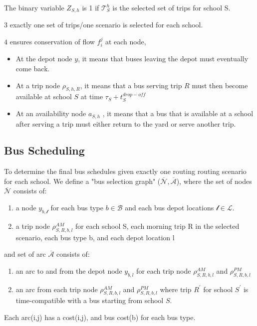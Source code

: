 \documentclass[11pt]{article}
\begin{document}
The binary variable \(Z_{S,h}\) is 1 if \(\mathcal{T}_S^h\) is the selected set
of trips for school S.


\(3\) exactly one set of trips/one scenario is
selected for each school. 

\(4\) ensures conservation of flow \(f_i^j\) at each node, 
\begin{itemize}
\item At the depot node \(y\), it means that buses leaving the depot must
eventually come back.
\item At a trip node \(\rho_{S,h,R}\), it means that a bus serving trip \(R\) must then
become available at school \(S\) at time \(\tau_S + t_S^{drop-off}\)
\item At an availability node \(a_{S,h}\) , it means that a bus that is available at
a school after serving a trip must either return to the yard or serve
another trip.
\end{itemize}

\subsection{Bus Scheduling}
\label{sec:orgf39c523}
To determine the final bus schedules given exactly one routing routing scenario for each school.
We define a "bus selection graph" (\(\overline{\mathcal{N}}, \overline{\mathcal{A}}\)), where the
set of nodes \(\overline{\mathcal{N}}\) consists of: 
\begin{enumerate}
\item a node \(y_{b,\mathcal{l}}\) for each bus type \(b \in \mathcal{B}\) and each
bus depot locations \(\mathcal{l} \in \mathcal{L}\).
\item a trip node \(\rho_{S,R,b,l}^{AM}\) for each school S, each morning trip R in the selected
scenario, each bus type b, and each depot location l
\end{enumerate}

and set of arc  \(\overline{\mathcal{A}}\) consists of:
\begin{enumerate}
\item an arc to and from the depot node \(y_{b,l}\) for each trip node
\(\rho_{S,R,b,l}^{AM}\) and \(\rho_{S,R,b,l}^{PM}\)
\item an arc from each trip node \(\rho_{S,R,b,l}^{AM}\) and
\(\rho_{S,R,b,l}^{PM}\) where trip \(R^{'}\) for school \(S^{'}\) is
time-compatible with a bus starting from school \(S\).
\end{enumerate}

Each arc(i,j) has a cost(i,j), and bus cost(b) for each bus type.
\end{document}
